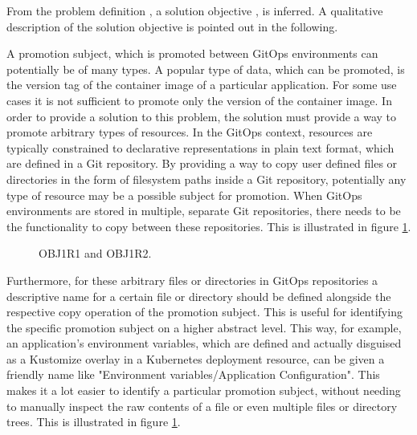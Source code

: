 From the problem definition
,
a solution objective
,
is inferred.
A qualitative description of the solution objective
is pointed out in the following.

A promotion subject, which is promoted between GitOps environments can potentially
be of many types. A popular type of data, which can be promoted,
is the version tag of the container image of a particular application.
For some use cases it is not sufficient to promote only the version of the container image.
In order to provide a solution to this problem,
the solution must provide a way to promote arbitrary types of resources.
In the GitOps context, resources are typically constrained to declarative
representations in plain text format, which are defined in a Git repository.
By providing a way to copy user defined files or directories in the form
of filesystem paths inside a Git repository,
potentially any type of resource may be a possible subject for promotion.
When GitOps environments are stored in multiple, separate Git repositories,
there needs to be the functionality to copy between these repositories.
This is illustrated in figure \ref{fig:OBJ1R1-and-OBJ1R2}.
%

\begin{figure}[h]
	\centering
	\caption{OBJ1R1 and OBJ1R2.
	}
	\label{fig:OBJ1R1-and-OBJ1R2}	
\end{figure}

Furthermore, for these arbitrary files or directories in GitOps repositories
a descriptive name for a certain file or directory
should be defined alongside the
respective copy operation of the promotion subject.
This is useful for identifying the specific promotion subject
on a higher abstract level.
This way, for example, an application's environment variables,
which are defined and actually disguised as a Kustomize overlay in a Kubernetes deployment resource,
can be given a friendly name like "Environment variables/Application Configuration".
This makes it a lot easier to identify a particular promotion subject, without
needing to manually inspect the raw contents of a file or even multiple files or
directory trees.
This is illustrated in figure \ref{fig:OBJ1R1-and-OBJ1R2}.

